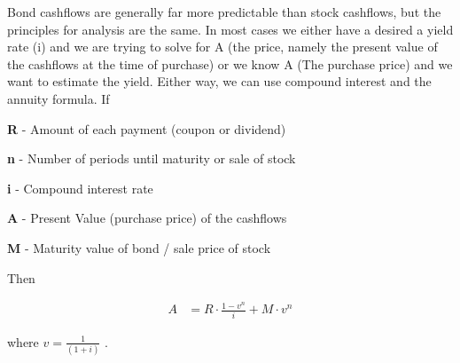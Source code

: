 \documentclass[12pt]{article}
\begin{document}
\begin{flushleft}
    Bond cashflows are generally far more predictable than stock cashflows, but the principles
    for analysis are the same.  In most cases we either have a desired a yield rate (i) and we are trying
    to solve for A (the price, namely the present value of the cashflows at the time of purchase) or we know A (The
    purchase price) and we want to estimate the yield.  Either way, we can use compound interest and
    the annuity formula.  If
\end{flushleft}
\vspace{.25in}

\begin{description}
    \item \textbf{R} - Amount of each payment (coupon or dividend)
    \item\textbf{n} - Number of periods until maturity or sale of stock
    \item\textbf{i} - Compound interest rate
    \item\textbf{A} - Present Value (purchase price) of the cashflows
    \item\textbf{M} - Maturity value of bond / sale price of stock
\end{description}
\vspace{.25in}

\begin{flushleft}
    Then
\end{flushleft}




\begin{align*}
    A & = R \cdot \frac{1 - v^n}{i} + M \cdot v^n
\end{align*}


\begin{flushleft}
    where {\large $ v = \frac{1}{(1+i)} $ }.
\end{flushleft}
\vspace{.1in}
\end{document}
